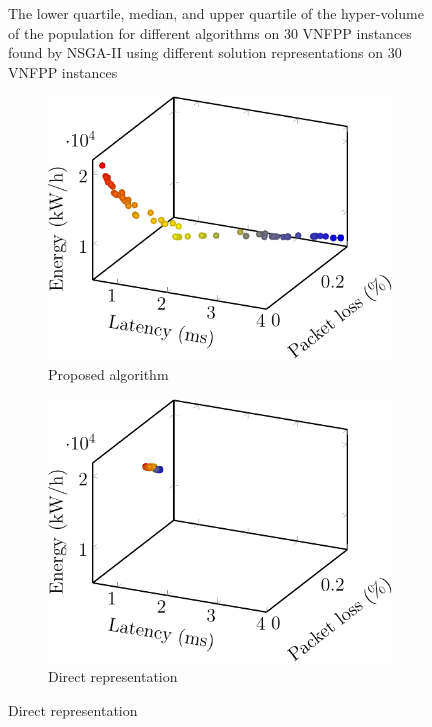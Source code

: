 \begin{enumerate}
\begin{figure}[t!]
                  \caption{The lower quartile, median, and upper quartile of the hyper-volume of the population for different algorithms on 30 VNFPP instances found by NSGA-II using different solution representations on 30 VNFPP instances}
            \end{figure}
            \begin{figure}[t!]
                  \centering
                  \begin{subfigure}[b]{0.3625\linewidth}
                        \includegraphics[width=\textwidth]{figs/qm-crop}
                        \caption{Proposed algorithm}
                  \end{subfigure}
                  \begin{subfigure}[b]{0.3625\linewidth}
                        \includegraphics[width=\textwidth]{figs/std-crop}
                        \caption{Direct representation}
                  \end{subfigure}


\end{figure}
\end{enumerate}
